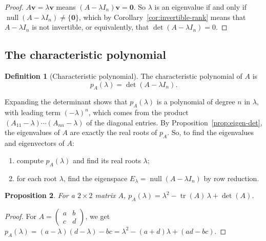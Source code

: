 \documentclass[11pt]{article}
\theoremstyle{definition}
\newtheorem{definition}{Definition}[section]
\theoremstyle{plain}
\newtheorem{proposition}[definition]{Proposition}
\theoremstyle{remark}
\DeclareMathOperator{\Null}{null}
\DeclareMathOperator{\tr}{tr}
\begin{document}
\begin{proof}
    $A\mathbf{v} = \lambda \mathbf{v}$ means $(A - \lambda I_n)\mathbf{v} = \mathbf{0}$. So $\lambda$ is an eigenvalue if and only if $\Null(A - \lambda I_n) \neq \{\mathbf{0}\}$, which by Corollary~\ref{cor:invertible-rank} means that $A - \lambda I_n$ is not invertible, or equivalently, that $\det(A - \lambda I_n) = 0$.
\end{proof}

\subsection{The characteristic polynomial}

\begin{definition}[Characteristic polynomial]
    The characteristic polynomial of $A$ is
    \[p_A(\lambda) = \det(A - \lambda I_n).\]
\end{definition}

Expanding the determinant shows that $p_A(\lambda)$ is a polynomial of degree $n$ in $\lambda$, with leading term $(-\lambda)^n$, which comes from the product $(A_{11} - \lambda) \cdots (A_{nn} - \lambda)$ of the diagonal entries. By Proposition~\ref{prop:eigen-det}, the eigenvalues of $A$ are exactly the real roots of $p_A$. So, to find the eigenvalues and eigenvectors of $A$:
\begin{enumerate}
    \item compute $p_A(\lambda)$ and find its real roots $\lambda$;
    \item for each root $\lambda$, find the eigenspace $E_\lambda = \Null(A - \lambda I_n)$ by row reduction.
\end{enumerate}

\begin{proposition}\label{prop:char-poly-2x2}
    For a $2 \times 2$ matrix $A$, $p_A(\lambda) = \lambda^2 - \tr(A)\, \lambda + \det(A)$.
\end{proposition}

\begin{proof}
    For $A = \begin{pmatrix} a & b \\ c & d \end{pmatrix}$, we get $p_A(\lambda) = (a - \lambda)(d - \lambda) - bc = \lambda^2 - (a + d)\lambda + (ad - bc)$.
\end{proof}
\end{document}
